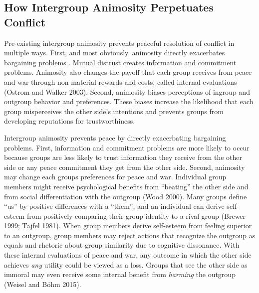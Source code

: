 \documentclass[11pt]{article}
\begin{document}
\hypertarget{how-intergroup-animosity-perpetuates-conflict}{%
\subsection{How Intergroup Animosity Perpetuates
Conflict}\label{how-intergroup-animosity-perpetuates-conflict}}

Pre-existing intergroup animosity prevents peaceful resolution of
conflict in multiple ways. First, and most obviously, animosity directly
exacerbates bargaining problems . Mutual distrust creates information
and commitment problems. Animosity also changes the payoff that each
group receives from peace and war through non-material rewards and
costs, called internal evaluations (Ostrom and Walker 2003). Second,
animosity biases perceptions of ingroup and outgroup behavior and
preferences. These biases increase the likelihood that each group
misperceives the other side's intentions and prevents groups from
developing reputations for trustworthiness.

Intergroup animosity prevents peace by directly exacerbating bargaining
problems. First, information and commitment problems are more likely to
occur because groups are less likely to trust information they receive
from the other side or any peace commitment they get from the other
side. Second, animosity may change each groups preferences for peace and
war. Individual group members might receive psychological benefits from
``beating'' the other side and from social differentiation with the
outgroup (Wood 2000). Many groups define ``us'' by positive differences
with a ``them'', and an individual can derive self-esteem from
positively comparing their group identity to a rival group (Brewer 1999;
Tajfel 1981). When group members derive self-esteem from feeling
superior to an outgroup, group members may reject actions that recognize
the outgroup as equals and rhetoric about group similarity due to
cognitive dissonance. With these internal evaluations of peace and war,
any outcome in which the other side achieves \emph{any} utility could be
viewed as a loss. Groups that see the other side as immoral may even
receive some internal benefit from \emph{harming} the outgroup (Weisel
and Böhm 2015).
\end{document}
